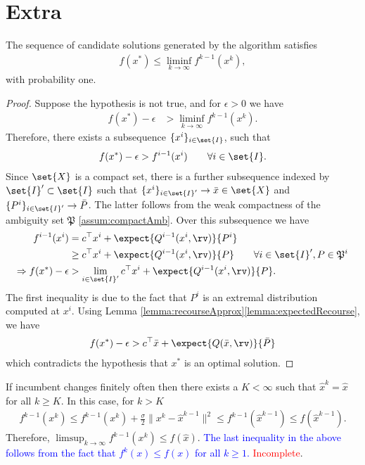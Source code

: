 \documentclass[11pt]{article}
\newcommand{\probset}{\mathfrak{P}}
\begin{document}
\section{Extra}
\begin{lemma}
The sequence of candidate solutions generated by the algorithm satisfies
\begin{align*}
    f(x^*) \leq \liminf_{k \rightarrow \infty} f^{k-1}(x^k), 
\end{align*}
with probability one.
\end{lemma}
\begin{proof}
Suppose the hypothesis is not true, and for $\epsilon >0$ we have
\begin{align*}
    f(x^*) - \epsilon &> \liminf_{k \rightarrow \infty} f^{k-1}(x^k).
\end{align*}
Therefore, there exists a subsequence $\{x^i\}_{i \in \set{I}}$, such that
\begin{align}\label{eq:fkn}
    f(x^*) - \epsilon > f^{i-1}(x^i) \qquad \forall i \in \set{I}.
\end{align}
Since $\set{X}$ is a compact set, there is a further subsequence indexed by $\set{I}' \subset \set{I}$ such that $\{x^i\}_{i \in \set{I}'} \rightarrow \bar{x} \in \set{X}$ and \textcolor{red}{$\{P^i\}_{i \in \set{I}'} \rightarrow \bar{P}$}. The latter follows from the weak compactness of the ambiguity set $\probset$ \ref{assum:compactAmb}. Over this subsequence we have 
\begin{align*}
	f^{i-1}(x^i) &= c^\top x^i + \expect{Q^{i-1}(x^i,\rv)}{P^i} \\
	& \geq c^\top x^i + \expect{Q^{i-1}(x^i,\rv)}{P} \qquad \forall i \in \set{I}', P \in \probset^i  \\
	\Rightarrow f(x^*) - \epsilon &> \lim_{i \in \set{I}'} c^\top x^i + \expect{Q^{i-1}(x^i,\rv)}{P}.
\end{align*}
The first inequality is due to the fact that $P^i$ is an extremal distribution computed at $x^i$. Using Lemma \ref{lemma:recourseApprox}\ref{lemma:expectedRecourse}, we have
\begin{align*}
	f(x^*) - \epsilon > c^\top \bar{x} + \expect{Q(\bar{x}, \rv)}{\bar{P}}
\end{align*}
which contradicts the hypothesis that $x^*$ is an optimal solution. 
\end{proof}

If incumbent changes finitely often then there exists a $K < \infty$ such that $\hat{x}^k = \hat{x}$ for all $k \geq K$. In this case, for $k > K$
\begin{align*}
    f^{k-1}(x^k) \leq f^{k-1}(x^k) + \frac{\sigma}{2}\|x^k - \hat{x}^{k-1}\|^2 \leq f^{k-1}(\hat{x}^{k-1}) \leq f(\hat{x}^{k-1}).
\end{align*}
Therefore, $\limsup_{k\rightarrow \infty} f^{k-1}(x^k) \leq f(\hat{x})$. \textcolor{blue}{The last inequality in the above follows from the fact that $f^k(x) \leq f(x)$ for all $k \geq 1$.}
\textcolor{red}{Incomplete}.



\end{document}
